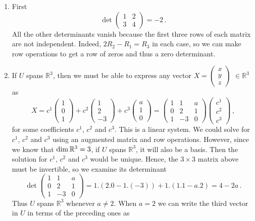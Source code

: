 \begin{enumerate}
\item First 
\[\det\begin{pmatrix}1&2\\3&4\end{pmatrix}=-2\, .\]
All the other determinants vanish because the first three rows of each matrix are not independent. 
Indeed, $2R_2-R_1=R_3$ in each case, so we can make row operations to get a row of zeros and thus a zero determinant. 

\item If $U$ spans ${\mathbb R}^3$, then we must be able to express any vector $X=\begin{pmatrix}x\\y\\z\end{pmatrix}$ $\in {\mathbb R}^3$
as
\[
X=c^1\begin{pmatrix}1\\0\\1\end{pmatrix}+c^2\begin{pmatrix}1\\2\\-3\end{pmatrix}+c^3\begin{pmatrix}a\\1\\0\end{pmatrix}
=\begin{pmatrix}1&1&a\\0&2&1\\1&-3&0\end{pmatrix}\begin{pmatrix}c^1\\c^2\\c^3\end{pmatrix}\, ,
\]
for some coefficients $c^1$, $c^2$ and $c^3$. This is a linear system. We could solve for $c^1$, $c^2$ and $c^3$ using an
augmented matrix and row operations. However, since we know that $\operatorname{dim}{\mathbb R}^3=3$, if $U$ spans ${\mathbb R}^3$,
it will also be a basis. Then the solution for  $c^1$, $c^2$ and $c^3$ would be unique. Hence, the $3\times 3$ matrix above must 
be invertible, so we examine its determinant
\[
\det\begin{pmatrix}1&1&a\\0&2&1\\1&-3&0\end{pmatrix}
=1.(2.0-1.(-3))+1.(1.1-a.2)=4-2a\, .
\]
Thus $U$ spans ${\mathbb R}^3$ whenever $a\neq 2$. When $a=2$ we can write the third vector in $U$ in terms of the preceding ones as

\end{enumerate}
